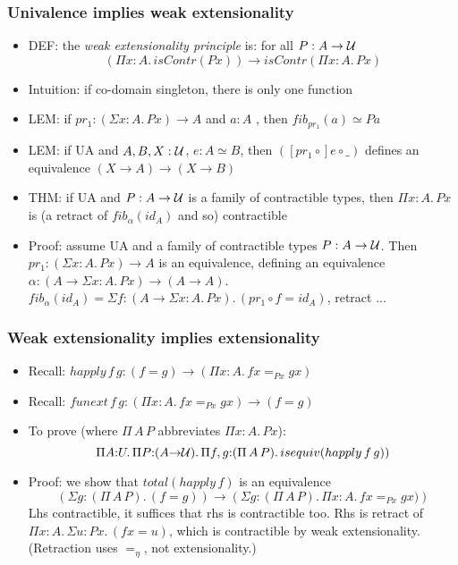 \documentclass[handout]{beamer}
\newcommand{\depi}[3]{\Pi{#1{:}#2.\,#3}}
\newcommand{\sigm}[3]{\Sigma{#1{:}#2.\,#3}}
\newcommand{\UU}{{\cal U}}
\begin{document}
    \frame
  {
    \frametitle{Univalence implies weak extensionality}

    \begin{itemize}[<+->]
    \item DEF: the \emph{weak extensionality principle} is: for all $P: A\to\UU$
\[(\depi{x}{A}{isContr(Px)})\to isContr(\depi{x}{A}{Px})\]
    \item Intuition: if co-domain singleton, there is only one function    
    \item LEM: if $pr_1:(\sigm{x}{A}{Px}) \to A$ and $a:A$ , then $fib_{pr_1}(a)\simeq Pa$ 
    \item LEM: if UA and $A,B,X:\UU$, $e:A\simeq B$, then $([pr_1{\circ}] e\circ\_)$
    defines an equivalence $(X\to A) \to (X\to B)$    
    \item THM: if UA and $P:A\to\UU$ is a family of contractible types, then 
    $\depi{x}{A}{Px}$ is (a retract of $fib_{\alpha}(id_A)$ and so) contractible
    \item Proof: assume UA and a family of contractible types $P:A\to\UU$. 
             Then $pr_1:(\sigm{x}{A}{Px}) \to A$ is an equivalence,
             defining an equivalence $\alpha: (A\to\sigm{x}{A}{Px}) \to (A\to A)$.
             $fib_{\alpha}(id_A)=\sigm{f}{(A{\to}\sigm{x}{A}{Px})}{(pr_1{\circ} f = id_A)}$, retract ...  
\end{itemize}
  } 
 
     \frame
  {
    \frametitle{Weak extensionality implies extensionality}

    \begin{itemize}[<+->]
    \item Recall: $happly\,f\,g: (f=g) \to (\depi{x}{A}{fx = _{Px} gx})$ 
    \item Recall:  $funext\,f\,g: (\depi{x}{A}{fx = _{Px} gx}) \to (f=g)$   
    \item To prove (where $\Pi\,A\,P$ abbreviates $\depi{x}{A}{Px}$):
\[\depi{A}{U}{\depi{P}{(A{\to}\UU)}{\depi{f,g}{(\Pi\,A\,P)}{isequiv(happly\,f\,g)}}})\]
    \item Proof:  we show that $total(happly\,f)$ is an equivalence
\[(\sigm{g}{(\Pi\,A\,P)}{(f=g)}) \to (\sigm{g}{(\Pi\,A\,P)}{\depi{x}{A}{fx = _{Px} gx})})\]
Lhs contractible, it suffices that rhs is contractible too. Rhs is retract of 
$\depi{x}{A}{\sigm{u}{Px}{(fx=u)}}$, which is contractible by weak extensionality.
(Retraction uses $=_{\eta}$, not extensionality.)
    \end{itemize}


  } 
  
\end{document}
